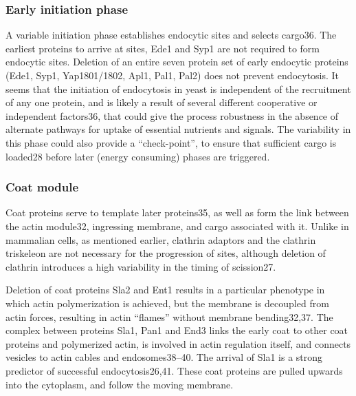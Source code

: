 			\subsubsection{Early initiation phase}
			A variable initiation phase establishes endocytic sites and selects cargo36. The earliest proteins to arrive at sites, Ede1 and Syp1 are not required to form endocytic sites. Deletion of an entire seven protein set of early endocytic proteins (Ede1, Syp1, Yap1801/1802, Apl1, Pal1, Pal2) does not prevent endocytosis. It seems that the initiation of endocytosis in yeast is independent of the recruitment of any one protein, and is likely a result of several different cooperative or independent factors36, that could give the process robustness in the absence of alternate pathways for uptake of essential nutrients and signals. The variability in this phase could also provide a “check-point”, to ensure that sufficient cargo is loaded28 before later (energy consuming) phases are triggered. 

			
			\subsubsection{Coat module}
			Coat proteins serve to template later proteins35, as well as form the link between the actin module32, ingressing membrane, and cargo associated with it. Unlike in mammalian cells, as mentioned earlier, clathrin adaptors and the clathrin triskeleon are not necessary for the progression of sites, although deletion of clathrin introduces a high variability in the timing of scission27. 
			
			\vspace{5mm}
			Deletion of coat proteins Sla2 and Ent1 results in a particular phenotype in which actin polymerization is achieved, but the membrane is decoupled from actin forces, resulting in actin “flames” without membrane bending32,37. The complex between proteins Sla1, Pan1 and End3 links the early coat to other coat proteins and polymerized actin, is involved in actin regulation itself, and connects vesicles to actin cables and endosomes38–40. The arrival of Sla1 is a strong predictor of successful endocytosis26,41. These coat proteins are pulled upwards into the cytoplasm, and follow the moving membrane.



